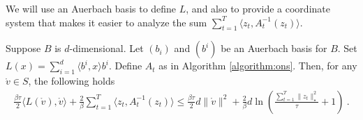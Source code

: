 \documentclass[12pt]{colt2018} %
\renewcommand{\v}{\mathring{v}}
\begin{document}
We will use an Auerbach basis to define $L$, and also to provide a coordinate system that makes it easier to analyze the sum $\sum_{t=1}^T \langle z_t,  A^{-1}_{t}(z_t)\rangle$.
%
\begin{theorem}\label{thm:useauerbach}
Suppose $B$ is $d$-dimensional. Let $(b_i)$ and $(b^i)$ be an Auerbach basis for $B$. Set $L(x)=\sum_{i=1}^d \langle b^i, x\rangle b^i$. Define $A_t$ as in Algorithm \ref{algorithm:ons}. Then, for any $\v \in S$, the following holds
\begin{align*}
\frac{\beta\tau}{2} \langle L(\v), \v\rangle + \frac{2}{\beta} \sum_{t=1}^T \langle z_t,  A^{-1}_{t}(z_t)\rangle
\le \frac{\beta\tau}{2}d\|\v\|^2 +\frac{2}{\beta}d\ln\left(\frac{\sum_{t=1}^T \|z_t\|_\star ^2}{\tau} + 1\right)~.
\end{align*}
\end{theorem}
%
\end{document}
